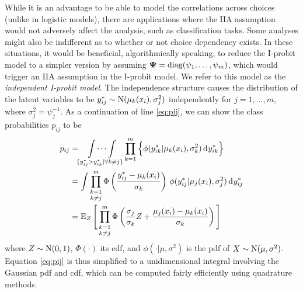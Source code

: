 While it is an advantage to be able to model the correlations across choices (unlike in logistic models), there are applications where the IIA assumption would not adversely affect the analysis, such as classification tasks.
Some analyses might also be indifferent as to whether or not choice dependency exists.
In these situations, it would be beneficial, algorithmically speaking, to reduce the I-probit model to a simpler version by assuming ${\bm\Psi} = \operatorname{diag}(\psi_1,\dots,\psi_m)$, which would trigger an IIA assumption in the I-probit model.
We refer to this model as the \emph{independent I-probit model}.
The independence structure causes the distribution of the latent variables to be $y_{ij}^* \sim \operatorname{N}(\mu_k(x_i), \sigma_j^2)$ independently for $j=1,\dots,m$, where $\sigma_j^2 = \psi_j^{-1}$.
As a continuation of line \cref{eq:pij}, we can show the class probabilities $p_{ij}$ to be
\begingroup
\setlength{\abovedisplayskip}{10pt}
\setlength{\belowdisplayskip}{10pt}
\begin{align}
  p_{ij} 
  &= \idotsint\displaylimits_{\{y_{ij}^* > y_{ik}^* | \forall k \neq j\}} 
  \prod_{k=1}^m \Big\{ \phi(y_{ik}^*|\mu_k(x_i), \sigma_k^2) \operatorname{d}\hspace{0.5pt}\! y_{ik}^* \Big\} \nonumber \\
  &= \int \mathop{\prod_{k=1}^m}_{k\neq j} 
  \Phi \left( \frac{y_{ij}^* - \mu_k(x_i)}{\sigma_k} \right) \,
   \phi(y_{ij}^*|\mu_j(x_i), \sigma_j^2)  \operatorname{d}\hspace{0.5pt}\! y_{ij}^* \nonumber \\
  &= \operatorname{E}_Z \Bigg[ \mathop{\prod_{k=1}^m}_{k\neq j} 
  \Phi \left(\frac{\sigma_j}{\sigma_k} Z + \frac{\mu_j(x_i) - \mu_k(x_i)}{\sigma_k} \right) \Bigg] \label{eq:pij2}
\end{align}
\endgroup
where $Z\sim\operatorname{N}(0,1)$, $\Phi(\cdot)$ its cdf, and $\phi(\cdot|\mu,\sigma^2)$ is the pdf of $X\sim\operatorname{N}(\mu,\sigma^2)$.
{\color{lsedpr}Equation} \ref{eq:pij} is thus simplified to a unidimensional integral involving the Gaussian pdf and cdf, which can be computed fairly efficiently using quadrature methods.
